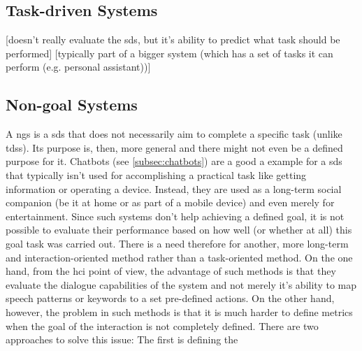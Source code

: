 \subsection{Task-driven Systems}
\label{subsec:task-driven_systems}
[doesn't really evaluate the \ac{sds}, but it's ability to predict what task should be performed]
[typically part of a bigger system (which has a set of tasks it can perform (e.g. personal assistant))]

\subsection{Non-goal Systems}
\label{subsec:non-goal_systems}

A \acf{ngs} is a \ac{sds} that does not necessarily aim to complete a specific task (unlike \acp{tds}).
Its purpose is, then, more general and there might not even be a defined purpose for it.
Chatbots (see \cref{subsec:chatbots}) are a good a example for a \ac{sds} that typically isn't used for accomplishing a practical task like getting information or operating a device.
Instead, they are used as a long-term social companion (be it at home or as part of a mobile device) and even merely for entertainment. 
Since such systems don't help achieving a defined goal, it is not possible to evaluate their performance based on how well (or whether at all) this goal task was carried out.
There is a need therefore for another, more long-term and interaction-oriented method rather than a task-oriented method.
On the one hand, from the \ac{hci} point of view, the advantage of such methods is that they evaluate the dialogue capabilities of the system and not merely it's ability to map speech patterns or keywords to a set pre-defined actions.
On the other hand, however, the problem in such methods is that it is much harder to define metrics when the goal of the interaction is not completely defined.
There are two approaches to solve this issue:
The first is defining the 
